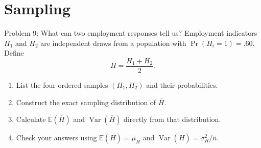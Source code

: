 \documentclass[notes,10pt, aspectratio=169]{beamer}
\newif\ifshowsolutions
\newcommand{\E}{\mathbb{E}}
\newcommand{\Var}{\operatorname{Var}}
\newcommand{\Cov}{\operatorname{Cov}}
\newcommand{\answerpart}[1]{\textcolor{blue}{\textbf{#1.}}\,}
\begin{document}
\ifshowsolutions
\begin{frame}{Solution 8: The risk of a two-part support payment}
\small
\answerpart{1}
For $S=100D+200H$, expected support is
\[
\E(S)=100(.40)+200(.60)=160\text{ euros}.
\]
\begin{align*}
\Var(S)&=100^2\Var(D)+200^2\Var(H)+2(100)(200)\Cov(D,H)\\
&=2{,}400+9{,}600+2{,}400=14{,}400\text{ euros}^2,\\
\operatorname{SD}(S)&=\sqrt{14{,}400}=120\text{ euros}.
\end{align*}
\answerpart{2}Omitting covariance gives $12{,}000$ euros$^2$, understating variance by $2{,}400$ euros$^2$.
\end{frame}
\fi

\section{Sampling}

\begin{frame}{Problem 9: What can two employment responses tell us?}
Employment indicators $H_1$ and $H_2$ are independent draws from a population with $\Pr(H_i=1)=.60$. Define
\[
\overline H=\frac{H_1+H_2}{2}.
\]
\begin{enumerate}
\setlength{\itemsep}{8pt}
\item List the four ordered samples $(H_1,H_2)$ and their probabilities.
\item Construct the exact sampling distribution of $\overline H$.
\item Calculate $\E(\overline H)$ and $\Var(\overline H)$ directly from that distribution.
\item Check your answers using $\E(\overline H)=\mu_H$ and $\Var(\overline H)=\sigma_H^2/n$.
\end{enumerate}
\end{frame}
\end{document}
